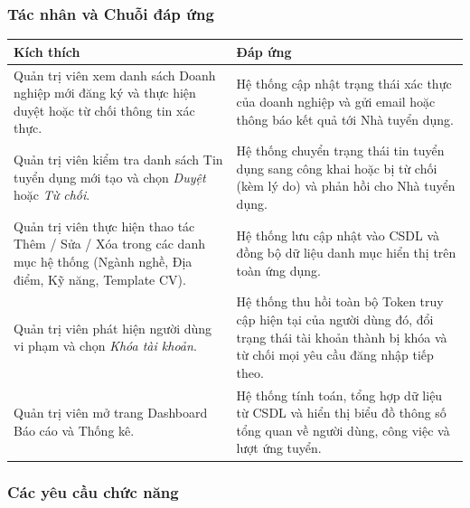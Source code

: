 \subsubsection{Tác nhân và Chuỗi đáp ứng}

\noindent
\begin{tabularx}{\textwidth}{|L{6cm}|X|}
    \hline
    \textbf{Kích thích} & \textbf{Đáp ứng} \\ \hline
    Quản trị viên xem danh sách Doanh nghiệp mới đăng ký và thực hiện duyệt hoặc từ chối thông tin xác thực. & Hệ thống cập nhật trạng thái xác thực của doanh nghiệp và gửi email hoặc thông báo kết quả tới Nhà tuyển dụng. \\ \hline
    Quản trị viên kiểm tra danh sách Tin tuyển dụng mới tạo và chọn \textit{Duyệt} hoặc \textit{Từ chối}. & Hệ thống chuyển trạng thái tin tuyển dụng sang công khai hoặc bị từ chối (kèm lý do) và phản hồi cho Nhà tuyển dụng. \\ \hline
    Quản trị viên thực hiện thao tác Thêm / Sửa / Xóa trong các danh mục hệ thống (Ngành nghề, Địa điểm, Kỹ năng, Template CV). & Hệ thống lưu cập nhật vào CSDL và đồng bộ dữ liệu danh mục hiển thị trên toàn ứng dụng. \\ \hline
    Quản trị viên phát hiện người dùng vi phạm và chọn \textit{Khóa tài khoản}. & Hệ thống thu hồi toàn bộ Token truy cập hiện tại của người dùng đó, đổi trạng thái tài khoản thành bị khóa và từ chối mọi yêu cầu đăng nhập tiếp theo. \\ \hline
    Quản trị viên mở trang Dashboard Báo cáo và Thống kê. & Hệ thống tính toán, tổng hợp dữ liệu từ CSDL và hiển thị biểu đồ thông số tổng quan về người dùng, công việc và lượt ứng tuyển. \\ \hline
\end{tabularx}

\subsubsection{Các yêu cầu chức năng}

